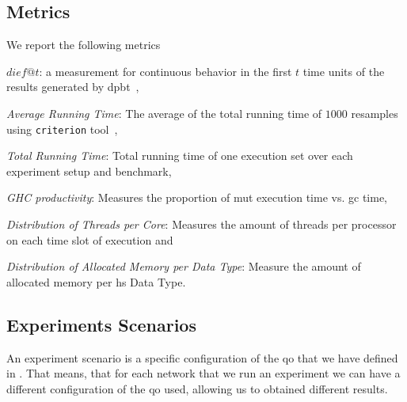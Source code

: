 \subsection{Metrics}\label{sub:metric}
We report the following metrics \begin{inparaenum}[\bf a\upshape)]
      \item {\bf $dief@t$}: a measurement for continuous behavior in the first $t$ time units of the results generated by \acrshort{dpbt}~\cite{diefpaper},
      \item \emph{Average Running Time}: The average of the total running time of $1000$ resamples using \texttt{criterion} tool~\cite{criterion},
      \item \emph{Total Running Time}: Total running time of one execution set over each experiment setup and benchmark,
      \item \emph{GHC productivity}: Measures the proportion of \acrfull{mut} execution time vs. \acrfull{gc} time,
      \item \emph{Distribution of Threads per Core}: Measures the amount of threads per processor on each time slot of execution and
      \item \emph{Distribution of Allocated Memory per Data Type}: Measure the amount of allocated memory per \acrshort{hs} Data Type.
  \end{inparaenum}
    
\subsection{Experiments Scenarios}\label{sub:exp:exp-data-setup}
An experiment scenario is a specific configuration of the \acrfull{qo} that we have defined in . 
That means, that for each network that we run an experiment we can have a different configuration of the \acrshort{qo} used, allowing us to obtained different results.

